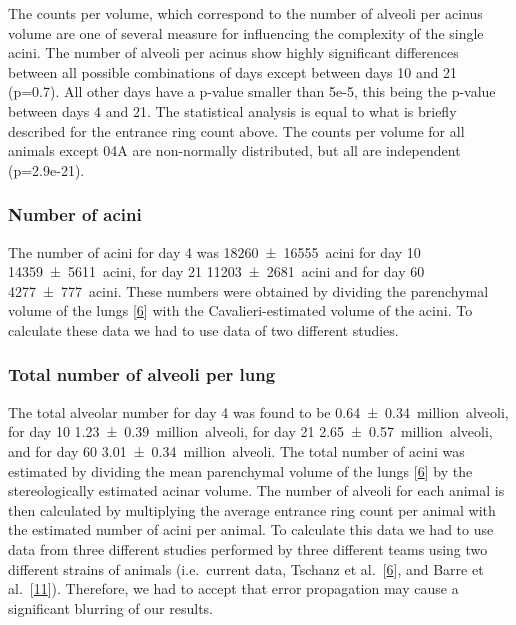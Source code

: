 \documentclass[
  american,
]{article}
\begin{document}
The counts per volume, which correspond to the number of alveoli per acinus volume are one of several measure for influencing the complexity of the single acini.
The number of alveoli per acinus show highly significant differences between all possible combinations of days except between days 10 and 21 (p=0.7).
All other days have a p-value smaller than 5e-5, this being the p-value between days 4 and 21.
The statistical analysis is equal to what is briefly described for the entrance ring count above.
The counts per volume for all animals except 04A are non-normally distributed, but all are independent (p=2.9e-21).

\hypertarget{number-of-acini}{%
\subsubsection{Number of acini}\label{number-of-acini}}

The number of acini for day 4 was 18260~±~16555~acini for day 10 14359~±~5611~acini, for day 21 11203~±~2681~acini and for day 60 4277~±~777~acini.
These numbers were obtained by dividing the parenchymal volume of the lungs {[}\protect\hyperlink{ref-wnl86DEM}{6}{]} with the Cavalieri-estimated volume of the acini.
To calculate these data we had to use data of two different studies.

\hypertarget{total-number-of-alveoli-per-lung}{%
\subsubsection{Total number of alveoli per lung}\label{total-number-of-alveoli-per-lung}}

The total alveolar number for day 4 was found to be 0.64~±~0.34~million~alveoli, for day 10 1.23~±~0.39~million~alveoli, for day 21 2.65~±~0.57~million~alveoli, and for day 60 3.01~±~0.34~million~alveoli.
The total number of acini was estimated by dividing the mean parenchymal volume of the lungs {[}\protect\hyperlink{ref-wnl86DEM}{6}{]} by the stereologically estimated acinar volume.
The number of alveoli for each animal is then calculated by multiplying the average entrance ring count per animal with the estimated number of acini per animal.
To calculate this data we had to use data from three different studies performed by three different teams using two different strains of animals (i.e.~current data, Tschanz et al.~{[}\protect\hyperlink{ref-wnl86DEM}{6}{]}, and Barre et al.~{[}\protect\hyperlink{ref-uFNlWogb}{11}{]}).
Therefore, we had to accept that error propagation may cause a significant blurring of our results.
\end{document}
